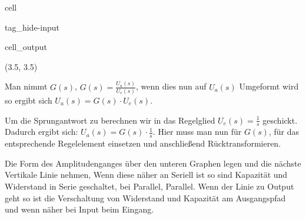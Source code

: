 \documentclass[letterpaper,10pt,english]{jupyterBook}
\begin{document}
\begin{sphinxuseclass}{cell}
\begin{sphinxuseclass}{tag_hide-input}\begin{sphinxVerbatimOutput}

\begin{sphinxuseclass}{cell_output}
\begin{sphinxVerbatim}[commandchars=\\\{\}]
(\PYGZhy{}3.5, 3.5)
\end{sphinxVerbatim}

\noindent{}

\end{sphinxuseclass}\end{sphinxVerbatimOutput}

\end{sphinxuseclass}
\end{sphinxuseclass}
\begin{DUlineblock}{0em}
\item[] 
\end{DUlineblock}

\sphinxAtStartPar
Man nimmt \(G(s)\), \(G(s) = \frac{U_a(s)}{U_e(s)}\), wenn dies nun auf \(U_a(s)\) Umgeformt wird so ergibt sich \(U_a(s) = G(s)\cdot U_e(s)\).

\sphinxAtStartPar
Um die Sprungantwort zu berechnen wir in das Regelglied \(U_e(s) = \frac{1}{s}\) geschickt.
Dadurch ergibt sich: \(U_a(s) = G(s)\cdot\frac{1}{s}\).
Hier muss man nun für \(G(s)\), für das entsprechende Regelelement einsetzen und anschließend Rücktransformieren.

\begin{DUlineblock}{0em}
\item[] 
\end{DUlineblock}

\sphinxAtStartPar
Die Form des Amplitudenganges über den unteren Graphen legen und die nächste Vertikale Linie nehmen,
Wenn diese näher an Seriell ist so sind Kapazität und Widerstand in Serie geschaltet,
bei Parallel, Parallel.
Wenn der Linie zu Output geht so ist die Verschaltung von Widerstand und Kapazität am Ausgangspfad
und wenn näher bei Input beim Eingang.
\end{document}
